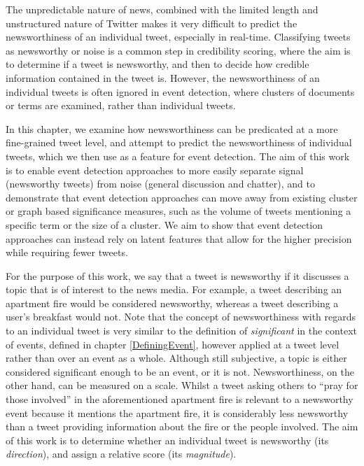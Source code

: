 
\label{sec:scoring:introduction}
The unpredictable nature of news, combined with the limited length and unstructured nature of Twitter makes it very difficult to predict the newsworthiness of an individual tweet, especially in real-time.
Classifying tweets as newsworthy or noise is a common step in credibility scoring, where the aim is to determine if a tweet is newsworthy, and then to decide how credible information contained in the tweet is.
However, the newsworthiness of an individual tweets is often ignored in event detection, where clusters of documents or terms are examined, rather than individual tweets.

In this chapter, we examine how newsworthiness can be predicated at a more fine-grained tweet level, and attempt to predict the newsworthiness of individual tweets, which we then use as a feature for event detection.
The aim of this work is to enable event detection approaches to more easily separate signal (newsworthy tweets) from noise (general discussion and chatter), and to demonstrate that event detection approaches can move away from existing cluster or graph based significance measures, such as the volume of tweets mentioning a specific term or the size of a cluster.
We aim to show that event detection approaches can instead rely on latent features that allow for the higher precision while requiring fewer tweets.

For the purpose of this work, we say that a tweet is newsworthy if it discusses a topic that is of interest to the news media.
For example, a tweet describing an apartment fire would be considered newsworthy, whereas a tweet describing a user's breakfast would not.
Note that the concept of newsworthiness with regards to an individual tweet is very similar to the definition of \emph{significant} in the context of events, defined in chapter \ref{DefiningEvent}, however applied at a tweet level rather than over an event as a whole.
Although still subjective, a topic is either considered significant enough to be an event, or it is not.
Newsworthiness, on the other hand, can be measured on a scale.
Whilst a tweet asking others to ``pray for those involved'' in the aforementioned apartment fire is relevant to a newsworthy event because it mentions the apartment fire, it is considerably less newsworthy than a tweet providing information about the fire or the people involved.
The aim of this work is to determine whether an individual tweet is newsworthy (its \emph{direction}), and assign a relative score (its \emph{magnitude}).

